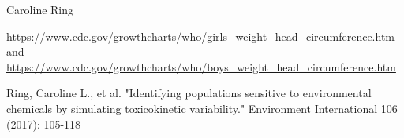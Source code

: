 \documentclass[a4paper]{book}
\begin{document}
%
\begin{Author}\relax
Caroline Ring
\end{Author}
%
\begin{Source}\relax
\url{https://www.cdc.gov/growthcharts/who/girls_weight_head_circumference.htm}
and
\url{https://www.cdc.gov/growthcharts/who/boys_weight_head_circumference.htm}
\end{Source}
%
\begin{References}\relax
Ring, Caroline L., et al. "Identifying populations sensitive to
environmental chemicals by simulating toxicokinetic variability." Environment
International 106 (2017): 105-118
\end{References}
\printindex{}
\end{document}
